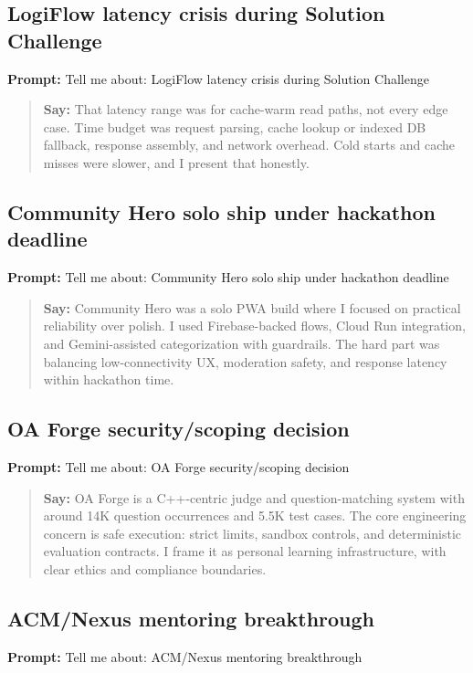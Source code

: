\documentclass[9pt,a4paper]{article}
\begin{document}
\subsection{LogiFlow latency crisis during Solution Challenge}
\textbf{Prompt:} Tell me about: LogiFlow latency crisis during Solution Challenge

\begin{quote}\small\textbf{Say:} That latency range was for cache-warm read paths, not every edge case. Time budget was request parsing, cache lookup or indexed DB fallback, response assembly, and network overhead. Cold starts and cache misses were slower, and I present that honestly.\end{quote}
\vspace{2mm}
\subsection{Community Hero solo ship under hackathon deadline}
\textbf{Prompt:} Tell me about: Community Hero solo ship under hackathon deadline

\begin{quote}\small\textbf{Say:} Community Hero was a solo PWA build where I focused on practical reliability over polish. I used Firebase-backed flows, Cloud Run integration, and Gemini-assisted categorization with guardrails. The hard part was balancing low-connectivity UX, moderation safety, and response latency within hackathon time.\end{quote}
\vspace{2mm}
\subsection{OA Forge security/scoping decision}
\textbf{Prompt:} Tell me about: OA Forge security/scoping decision

\begin{quote}\small\textbf{Say:} OA Forge is a C++-centric judge and question-matching system with around 14K question occurrences and 5.5K test cases. The core engineering concern is safe execution: strict limits, sandbox controls, and deterministic evaluation contracts. I frame it as personal learning infrastructure, with clear ethics and compliance boundaries.\end{quote}
\vspace{2mm}
\subsection{ACM/Nexus mentoring breakthrough}
\textbf{Prompt:} Tell me about: ACM/Nexus mentoring breakthrough
\end{document}
